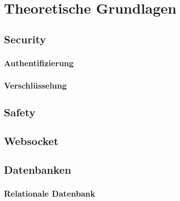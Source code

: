 \chapter{Theoretische Grundlagen}
\section{Security}
\subsection{Authentifizierung}
\subsection{Verschlüsselung}
\section{Safety}
\section{Websocket}
\section{Datenbanken}
\subsection{Relationale Datenbank}\label{subsec:relDB}

